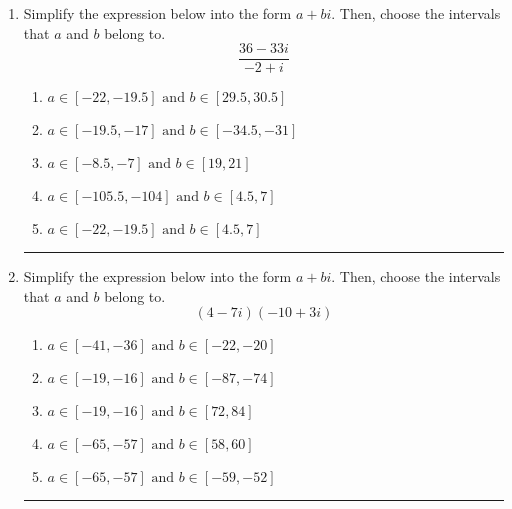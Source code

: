 \documentclass[14pt]{extbook}
\newcommand{\litem}[1]{\item#1\hspace*{-1cm}\rule{\textwidth}{0.4pt}}
\begin{document}
\begin{enumerate}
{\begin{enumerate}[label=\Alph*.]
\end{enumerate} }
\litem{
Simplify the expression below into the form $a+bi$. Then, choose the intervals that $a$ and $b$ belong to.\[ \frac{36 - 33 i}{-2 + i} \]\begin{enumerate}[label=\Alph*.]
\item \( a \in [-22, -19.5] \text{ and } b \in [29.5, 30.5] \)
\item \( a \in [-19.5, -17] \text{ and } b \in [-34.5, -31] \)
\item \( a \in [-8.5, -7] \text{ and } b \in [19, 21] \)
\item \( a \in [-105.5, -104] \text{ and } b \in [4.5, 7] \)
\item \( a \in [-22, -19.5] \text{ and } b \in [4.5, 7] \)

\end{enumerate} }
\litem{
Simplify the expression below into the form $a+bi$. Then, choose the intervals that $a$ and $b$ belong to.\[ (4 - 7 i)(-10 + 3 i) \]\begin{enumerate}[label=\Alph*.]
\item \( a \in [-41, -36] \text{ and } b \in [-22, -20] \)
\item \( a \in [-19, -16] \text{ and } b \in [-87, -74] \)
\item \( a \in [-19, -16] \text{ and } b \in [72, 84] \)
\item \( a \in [-65, -57] \text{ and } b \in [58, 60] \)
\item \( a \in [-65, -57] \text{ and } b \in [-59, -52] \)

\end{enumerate} }
\end{enumerate}
\end{document}

